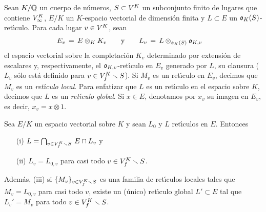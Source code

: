 % 
Sean $K/\bb{Q}$ un cuerpo de n\'{u}meros, $S\subset\lugares{K}$ un subconjunto
finito de lugares que contiene $\lugares[\infty]{K}$, $E/K$ un $K$-espacio
vectorial de dimensi\'{o}n finita y $L\subset E$ un $\oka{K}(S)$-ret\'{\i}culo.
Para cada lugar $v\in\lugares{K}$, sean
\begin{align*}
	E_{v}\,=\,E\tensor[K]{K_{v}} & \qquad\text{y}\qquad
		L_{v}\,=\,L\otimes_{\oka{K}(S)}\oka{K,v}
\end{align*}
%
el espacio vectorial sobre la completaci\'{o}n $K_{v}$ determinado por
extensi\'{o}n de escalares y, respectivamente, el $\oka{K,v}$-ret\'{\i}culo en
$E_{v}$ generado por $L$, su clausura ($L_{v}$ s\'{o}lo est\'{a} definido para
$v\in\lugares[f]{K}\setmin S$). Si $M_{v}$ es un ret\'{\i}culo en $E_{v}$,
decimos que $M_{v}$ es un \emph{ret\'{\i}culo local}. Para enfatizar que $L$ es
un ret\'{\i}culo en el espacio sobre $K$, decimos que $L$ es un
\emph{ret\'{\i}culo global}. Si $x\in E$, denotamos por $x_{v}$ su imagen en
$E_{v}$, es decir, $x_{v}=x\otimes 1$.

\begin{propoLocalGlobalLattices}\label{propo:localgloballattices}
	Sea $E/K$ un espacio vectorial sobre $K$ y sean $L_{0}$ y $L$
	ret\'{\i}culos en $E$. Entonces
	\begin{itemize}
		\item[(i)]
			\begin{math}
				L=\bigcap_{v\in\lugares[f]{K}\setmin S}\,
					E\cap L_{v}
			\end{math}
			y
		\item[(ii)] $L_{v}=L_{0,v}$ para casi todo
			$v\in\lugares[f]{K}\setmin S$.
	\end{itemize}
	Adem\'{a}s, (iii) si $\{M_{v}\}_{v\in\lugares[f]{K}\setmin S}$ es una
	familia de ret\'{\i}culos locales tales que $M_{v}=L_{0,v}$ para casi
	todo $v$, existe un (\'{u}nico) ret\'{\i}culo global $L'\subset E$ tal
	que $L_{v}'=M_{v}$ para todo $v\in\lugares[f]{K}\setmin S$.
\end{propoLocalGlobalLattices}
% 

